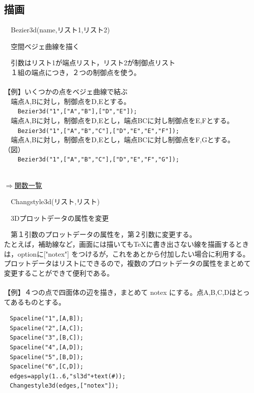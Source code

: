 \documentclass[papersize,a4paper,12pt,uplatex]{jsarticle}
\begin{document}
\subsection{描画}
\begin{description}

\hypertarget{bezier3d}{}
\item[関数]　Bezier3d(name,リスト1,リスト2)
\item[機能]　空間ベジェ曲線を描く
\item[説明]　引数はリスト1が端点リスト，リスト2が制御点リスト\\
　１組の端点につき，２つの制御点を使う。\\
　\\
【例】いくつかの点をベジェ曲線で結ぶ\\
　端点A,Bに対し，制御点をD,Eとする。\\
　　\verb|Bezier3d("1",["A","B"],["D","E"]);| 　\\
　端点A,Bに対し，制御点をD,Eとし，端点BCに対し制御点をE,Fとする。\\
　　\verb|Bezier3d("1",["A","B","C"],["D","E","E","F"]);|\\
　端点A,Bに対し，制御点をD,Eとし，端点BCに対し制御点をF,Gとする。（図）\\
　　\verb|Bezier3d("1",["A","B","C"],["D","E","F","G"]);|\\
　　

\begin{flushright} \hyperlink{functionlist3d}{$\Rightarrow$関数一覧}\end{flushright}

\hypertarget{changstyle3d}{}
\item[関数]　Changstyle3d(リスト,リスト)
\item[機能]　3Dプロットデータの属性を変更
\item[説明]　第１引数のプロットデータの属性を，第２引数に変更する。\\
たとえば，補助線など，画面には描いてもTeXに書き出さない線を描画するときは，optionに["notex"] をつけるが，これをあとから付加したい場合に利用する。プロットデータはリストにできるので，複数のプロットデータの属性をまとめて変更することができて便利である。\\
　\\
【例】４つの点で四面体の辺を描き，まとめて notex にする。点A,B,C,Dはとってあるものとする。
\begin{verbatim}
　Spaceline("1",[A,B]);
　Spaceline("2",[A,C]);
　Spaceline("3",[B,C]);
　Spaceline("4",[A,D]);
　Spaceline("5",[B,D]);
　Spaceline("6",[C,D]);
　edges=apply(1..6,"sl3d"+text(#));
　Changestyle3d(edges,["notex"]);
\end{verbatim}


\end{description}
\end{document}
